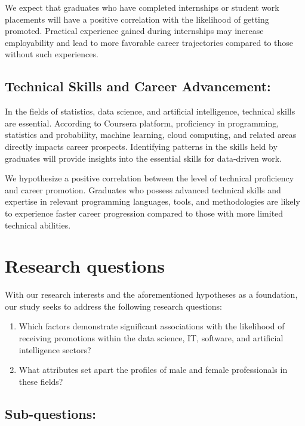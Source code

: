 \documentclass[11pt,]{article}
\begin{document}
We expect that graduates who have completed internships or student work
placements will have a positive correlation with the likelihood of
getting promoted. Practical experience gained during internships may
increase employability and lead to more favorable career trajectories
compared to those without such experiences.

\hypertarget{technical-skills-and-career-advancement}{%
\subsection{Technical Skills and Career
Advancement:}\label{technical-skills-and-career-advancement}}

In the fields of statistics, data science, and artificial intelligence,
technical skills are essential. According to Coursera platform,
proficiency in programming, statistics and probability, machine
learning, cloud computing, and related areas directly impacts career
prospects. Identifying patterns in the skills held by graduates will
provide insights into the essential skills for data-driven work.

We hypothesize a positive correlation between the level of technical
proficiency and career promotion. Graduates who possess advanced
technical skills and expertise in relevant programming languages, tools,
and methodologies are likely to experience faster career progression
compared to those with more limited technical abilities.

\hypertarget{research-questions}{%
\section{Research questions}\label{research-questions}}

With our research interests and the aforementioned hypotheses as a
foundation, our study seeks to address the following research questions:

\begin{enumerate}
\def\labelenumi{\arabic{enumi}.}
\item
  Which factors demonstrate significant associations with the likelihood
  of receiving promotions within the data science, IT, software, and
  artificial intelligence sectors?
\item
  What attributes set apart the profiles of male and female
  professionals in these fields?
\end{enumerate}

\hypertarget{sub-questions}{%
\subsection{Sub-questions:}\label{sub-questions}}
\end{document}
